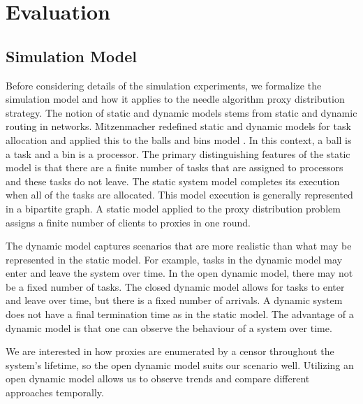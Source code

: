 \chapter{Evaluation}
\label{sec:eval}

\section{Simulation Model} 


Before considering details of the simulation experiments, we formalize the simulation model and how it applies to the needle algorithm proxy distribution strategy. The notion of static and dynamic models stems from static and dynamic routing in networks. Mitzenmacher redefined static and dynamic models for task allocation and applied this to the balls and bins model \cite{mitzenmacher1996power}. In this context, a ball is a task and a bin is a processor. The primary distinguishing features of the static model is that there are a finite number of tasks that are assigned to processors and these tasks do not leave. The static system model completes its execution when all of the tasks are allocated. This model execution is generally represented in a bipartite graph. A static model applied to the proxy distribution problem assigns a finite number of clients to proxies in one round.

The dynamic model captures scenarios that are more realistic than what may be represented in the static model. For example, tasks in the dynamic model may enter and leave the system over time. In the open dynamic model, there may not be a fixed number of tasks. The closed dynamic model allows for tasks to enter and leave over time, but there is a fixed number of arrivals. A dynamic system does not have a final termination time as in the static model. The advantage of a dynamic model is that one can observe the behaviour of a system over time.

We are interested in how proxies are enumerated by a censor throughout the system's lifetime, so the open dynamic model suits our scenario well. Utilizing an open dynamic model allows us to observe trends and compare different approaches temporally.

